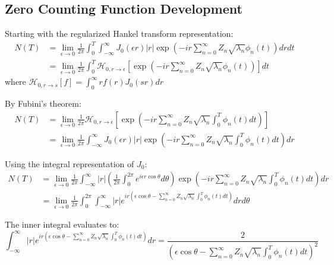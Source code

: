 \documentclass{article}
\begin{document}
\subsection{Zero Counting Function Development}
Starting with the regularized Hankel transform representation:
\begin{equation}
\begin{split}
    N(T) &= \lim_{\epsilon \to 0} \frac{1}{2\pi} \int_0^T \int_{-\infty}^{\infty} J_0(\epsilon r)|r| \exp\left(-ir\sum_{n=0}^{\infty} Z_n \sqrt{\lambda_n} \phi_n(t)\right) dr dt \\
    &= \lim_{\epsilon \to 0} \frac{1}{2\pi} \int_0^T \mathcal{H}_{0,r\to\epsilon}\left[\exp\left(-ir\sum_{n=0}^{\infty} Z_n \sqrt{\lambda_n} \phi_n(t)\right)\right] dt
\end{split}
\end{equation}
where $\mathcal{H}_{0,r\to s}[f] = \int_0^\infty rf(r)J_0(sr)dr$

By Fubini's theorem:
\begin{equation}
\begin{split}
    N(T) &= \lim_{\epsilon \to 0} \frac{1}{2\pi} \mathcal{H}_{0,r\to\epsilon}\left[\exp\left(-ir\sum_{n=0}^{\infty} Z_n \sqrt{\lambda_n} \int_0^T \phi_n(t) dt\right)\right] \\
    &= \lim_{\epsilon \to 0} \frac{1}{2\pi} \int_{-\infty}^{\infty} J_0(\epsilon r)|r| \exp\left(-ir\sum_{n=0}^{\infty} Z_n \sqrt{\lambda_n} \int_0^T \phi_n(t) dt\right) dr
\end{split}
\end{equation}

Using the integral representation of $J_0$:
\begin{equation}
\begin{split}
    N(T) &= \lim_{\epsilon \to 0} \frac{1}{2\pi} \int_{-\infty}^{\infty} |r| \left(\frac{1}{2\pi} \int_0^{2\pi} e^{i\epsilon r\cos\theta} d\theta\right) \exp\left(-ir\sum_{n=0}^{\infty} Z_n \sqrt{\lambda_n} \int_0^T \phi_n(t) dt\right) dr \\
    &= \lim_{\epsilon \to 0} \frac{1}{2\pi} \int_0^{2\pi} \int_{-\infty}^{\infty} |r| e^{ir(\epsilon\cos\theta - \sum_{n=0}^{\infty} Z_n \sqrt{\lambda_n} \int_0^T \phi_n(t) dt)} dr d\theta
\end{split}
\end{equation}

The inner integral evaluates to:
\begin{equation}
    \int_{-\infty}^{\infty} |r| e^{ir(\epsilon\cos\theta - \sum_{n=0}^{\infty} Z_n \sqrt{\lambda_n} \int_0^T \phi_n(t) dt)} dr = \frac{2}{(\epsilon\cos\theta - \sum_{n=0}^{\infty} Z_n \sqrt{\lambda_n} \int_0^T \phi_n(t) dt)^2}
\end{equation}
\end{document}
